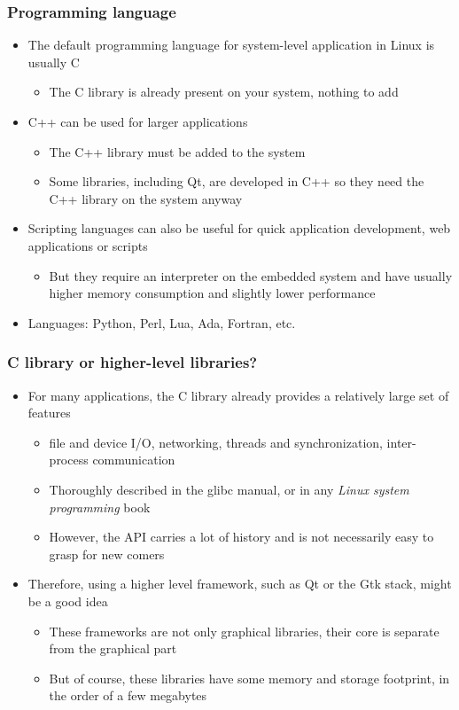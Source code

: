 \begin{frame}
  \frametitle{Programming language}
  \begin{itemize}
  \item The default programming language for system-level application
    in Linux is usually C
    \begin{itemize}
    \item The C library is already present on your system, nothing to
      add
    \end{itemize}
  \item C++ can be used for larger applications
    \begin{itemize}
    \item The C++ library must be added to the system
    \item Some libraries, including Qt, are developed in C++ so they
      need the C++ library on the system anyway
    \end{itemize}
  \item Scripting languages can also be useful for quick application
    development, web applications or scripts
    \begin{itemize}
    \item But they require an interpreter on the embedded system and
      have usually higher memory consumption and slightly lower
      performance
    \end{itemize}
  \item Languages: Python, Perl, Lua, Ada, Fortran, etc.
  \end{itemize}
\end{frame}

\begin{frame}
  \frametitle{C library or higher-level libraries?}
  \begin{itemize}
  \item For many applications, the C library already provides a
    relatively large set of features
    \begin{itemize}
    \item file and device I/O, networking, threads and
      synchronization, inter-process communication
    \item Thoroughly described in the glibc manual, or in any {\em
        Linux system programming} book
    \item However, the API carries a lot of history and is not
      necessarily easy to grasp for new comers
    \end{itemize}
  \item Therefore, using a higher level framework, such as Qt or the
    Gtk stack, might be a good idea
    \begin{itemize}
    \item These frameworks are not only graphical libraries, their
      core is separate from the graphical part
    \item But of course, these libraries have some memory and storage
      footprint, in the order of a few megabytes
    \end{itemize}
  \end{itemize}
\end{frame}

